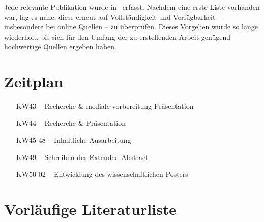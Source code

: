 \documentclass{article}
\begin{document}
Jede relevante Publikation wurde in \BibTeX\ erfasst. Nachdem eine erste Liste
vorhanden war, lag es nahe, diese erneut auf Vollständigkeit und Verfügbarkeit –
insbesondere bei online Quellen – zu überprüfen. Dieses Vorgehen wurde so lange
wiederholt, bis sich für den Umfang der zu erstellenden Arbeit genügend
hochwertige Quellen ergeben haben.


\newpage

\section{Zeitplan}

\begin{enumerate}
	\item[KW43]    – Recherche \& mediale vorbereitung Präsentation
	\item[KW44]    – Recherche \& Präsentation
	\item[KW45-48] – Inhaltliche Ausarbeitung
	\item[KW49]    – Schreiben des Extended Abstract
	\item[KW50-02] – Entwicklung des wissenschaftlichen Posters
\end{enumerate}

\section{Vorläufige Literaturliste}
\printbibliography[heading=none]
\nocite{*}


\end{document}
